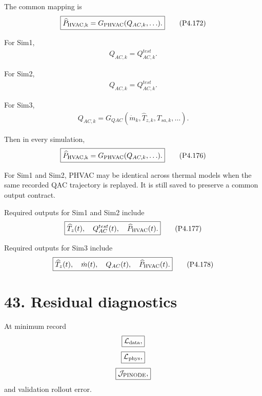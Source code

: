 \documentclass[11pt]{article}
\begin{document}
The common mapping is
\begin{align}
\boxed{
\widehat P_{\rm HVAC,k}
=
G_{\rm PHVAC}(Q_{AC,k},\ldots).
}
\tag{P4.172}
\end{align}

For Sim1,
\begin{align}
\boxed{Q_{AC,k}=Q_{AC,k}^{test}.}
\tag{P4.173}
\end{align}

For Sim2,
\begin{align}
\boxed{Q_{AC,k}=Q_{AC,k}^{test}.}
\tag{P4.174}
\end{align}

For Sim3,
\begin{align}
\boxed{
Q_{AC,k}
=
G_{QAC}
(\dot m_k,\widehat T_{z,k},T_{sa,k},\ldots).
}
\tag{P4.175}
\end{align}

Then in every simulation,
\begin{align}
\boxed{
\widehat P_{\rm HVAC,k}
=
G_{\rm PHVAC}(Q_{AC,k},\ldots).
}
\tag{P4.176}
\end{align}

For Sim1 and Sim2, PHVAC may be identical across thermal models when the same recorded QAC trajectory is replayed. It is still saved to preserve a common output contract.

Required outputs for Sim1 and Sim2 include
\begin{align}
\boxed{
\widehat T_z(t),
\quad
Q_{AC}^{test}(t),
\quad
\widehat P_{\rm HVAC}(t).
}
\tag{P4.177}
\end{align}

Required outputs for Sim3 include
\begin{align}
\boxed{
\widehat T_z(t),
\quad
\dot m(t),
\quad
Q_{AC}(t),
\quad
\widehat P_{\rm HVAC}(t).
}
\tag{P4.178}
\end{align}

\section*{43. Residual diagnostics}

At minimum record
\begin{align}
\boxed{\mathcal L_{\rm data},}
\end{align}
\begin{align}
\boxed{\mathcal L_{\rm phys},}
\end{align}
\begin{align}
\boxed{\mathcal J_{\rm PINODE},}
\end{align}
and validation rollout error.
\end{document}
